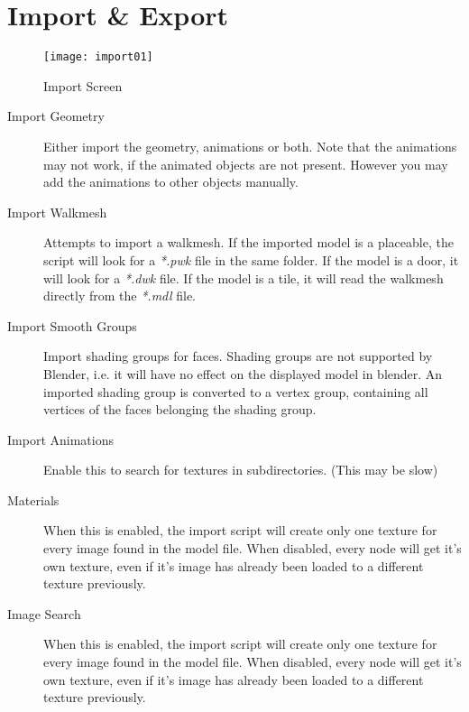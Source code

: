 \section{Import \& Export}

\begin{figure}
  \centering
  \texttt{[image: import01]}
  \caption[mdl import]{Import Screen}
  \label{fig:import01}
\end{figure}

\begin{description}
    \item[Import Geometry] Either import the geometry, animations or both. Note that the animations may not work, if the animated objects are not present. However you may add the animations to other objects manually.
    \item[Import Walkmesh] Attempts to import a walkmesh. If the imported model is a placeable, the script will look for a {\textit{*.pwk}} file in the same folder. If the model is a door, it will look for a {\textit{*.dwk}} file. If the model is a tile, it will read the walkmesh directly from the {\textit{*.mdl}} file.
    \item[Import Smooth Groups] Import shading groups for faces. Shading groups are not supported by Blender, i.e. it will have no effect on the displayed model in blender. An imported shading group is converted to a vertex group, containing all vertices of the faces belonging the shading group.
    \item[Import Animations] Enable this to search for textures in subdirectories. (This may be slow)
    \item[Materials] When this is enabled, the import script will create only one texture for every image found in the model file. When disabled, every node will get it's own texture, even if it's image has already been loaded to a different texture previously.
    \item[Image Search] When this is enabled, the import script will create only one texture for every image found in the model file. When disabled, every node will get it's own texture, even if it's image has already been loaded to a different texture previously.
\end{description}
